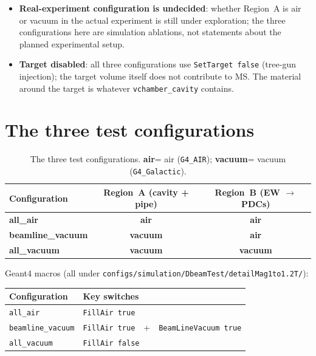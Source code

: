 \documentclass[a4paper, 11pt]{article}
\newcommand{\air}{\textcolor{airorange}{\textbf{air}}}
\newcommand{\vac}{\textcolor{vacblue}{\textbf{vacuum}}}
\begin{document}
\begin{itemize}[nosep]
  \item \textbf{Real-experiment configuration is undecided}: whether Region~A is air or vacuum in the actual experiment is still under exploration; the three configurations here are simulation ablations, not statements about the planned experimental setup.
  \item \textbf{Target disabled}: all three configurations use \texttt{SetTarget false} (tree-gun injection); the target volume itself does not contribute to MS. The material around the target is whatever \texttt{vchamber\_cavity} contains.
\end{itemize}

\section{The three test configurations}

\begin{table}[H]
\centering
\caption{The three test configurations. \air = air (\texttt{G4\_AIR}); \vac = vacuum (\texttt{G4\_Galactic}).}
\label{tab:conditions}
\begin{tabular}{lcc}
\toprule
Configuration & Region~A (cavity + pipe) & Region~B (EW $\to$ PDCs) \\
\midrule
\textbf{all\_air}          & \air & \air \\
\textbf{beamline\_vacuum}  & \vac & \air \\
\textbf{all\_vacuum}       & \vac & \vac \\
\bottomrule
\end{tabular}
\end{table}

Geant4 macros (all under \verb|configs/simulation/DbeamTest/detailMag1to1.2T/|):

\begin{center}
\begin{tabular}{ll}
\toprule
Configuration & Key switches \\
\midrule
\texttt{all\_air}         & \verb|FillAir true| \\
\texttt{beamline\_vacuum} & \verb|FillAir true|\ \ +\ \ \verb|BeamLineVacuum true| \\
\texttt{all\_vacuum}      & \verb|FillAir false| \\
\bottomrule
\end{tabular}
\end{center}
\end{document}
